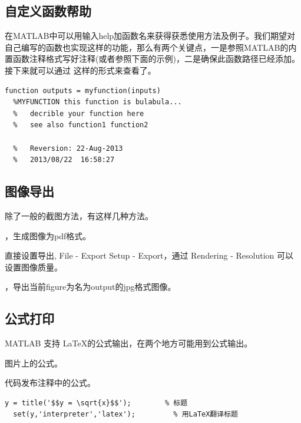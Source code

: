 \subsection{自定义函数帮助}

在MATLAB中可以用输入help加函数名来获得获悉使用方法及例子。我们期望对自己编写的函数也实现这样的功能，那么有两个关键点，一是参照MATLAB的内置函数注释格式写好注释(或者参照下面的示例)，二是确保此函数路径已经添加。接下来就可以通过  这样的形式来查看了。

\vspace{-0.8cm}
\begin{lstlisting}[caption = 自定义帮助]
  function outputs = myfunction(inputs)
  %MYFUNCTION this function is bulabula...
  %   decrible your function here
  %   see also function1 function2

  %   Reversion: 22-Aug-2013
  %   2013/08/22  16:58:27
\end{lstlisting}





\subsection{图像导出}

除了一般的截图方法，有这样几种方法。

\begindot
  \item {}，生成图像为pdf格式。
  \item 直接设置导出, File - Export Setup - Export，通过 Rendering - Resolution 可以设置图像质量。
  \item {}，导出当前figure为名为output的jpg格式图像。
\myenddot





\subsection{公式打印}
MATLAB 支持 \LaTeX 的公式输出，在两个地方可能用到公式输出。

\begindot
  \item 图片上的公式。
  \item 代码发布注释中的公式。
\myenddot

\vspace{-0.8cm}
\begin{lstlisting}[caption = 图像中的公式输出]
  y = title('$$y = \sqrt{x}$$');		% 标题
  set(y,'interpreter','latex');			% 用LaTeX翻译标题
\end{lstlisting}






